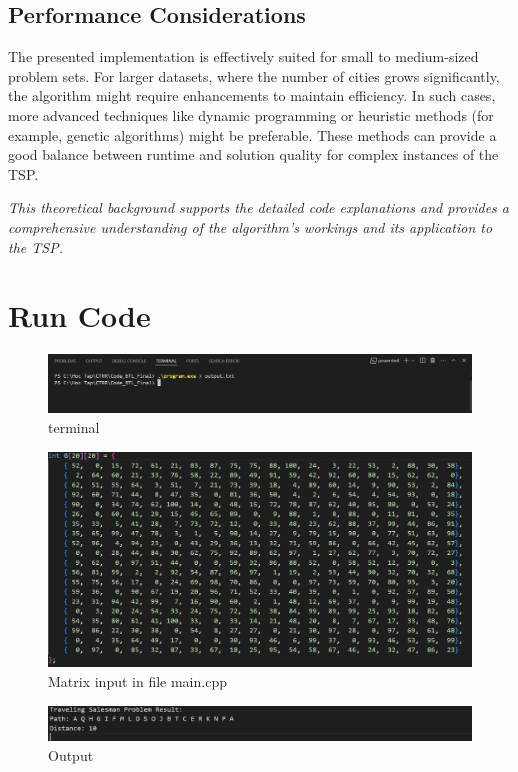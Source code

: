 \documentclass[a4paper]{article}
\begin{document}
\subsection{Performance Considerations}
The presented implementation is effectively suited for small to medium-sized problem sets. For larger datasets, where the number of cities grows significantly, the algorithm might require enhancements to maintain efficiency. In such cases, more advanced techniques like dynamic programming or heuristic methods (for example, genetic algorithms) might be preferable. These methods can provide a good balance between runtime and solution quality for complex instances of the TSP.

\textit{This theoretical background supports the detailed code explanations and provides a comprehensive understanding of the algorithm's workings and its application to the TSP.}
\section{Run Code}
\vspace{1cm}
\begin{figure}[h!]
\centering
\includegraphics[width=16cm]{terminal.png}
\caption{terminal}
\label{fig:terminal}
\end{figure}

\begin{figure}[h!]
\centering
\includegraphics[width=16cm]{input.png}
\caption{Matrix input in file main.cpp}
\label{fig:input}
\end{figure}

\begin{figure}[h!]
\centering
\includegraphics[width=16cm]{output.png}
\caption{Output}
\label{fig:output}
\end{figure}
\vspace{1cm}
\newpage
\end{document}
